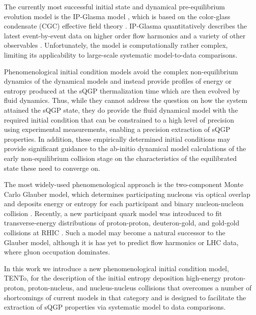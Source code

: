 \documentclass[aps,prc,reprint,amsmath,nofootinbib]{revtex4-1}
\newcommand{\trento}{T\raisebox{-.5ex}{R}ENTo}
\begin{document}
The currently most successful initial state and dynamical pre-equilibrium evolution model is the IP-Glasma model \cite{Schenke:2012wb}, which is based on the color-glass condensate (CGC) effective field theory \cite{McLerran:1993ni,McLerran:1993ka,Gelis:2010nm}.
IP-Glasma quantitatively describes the latest event-by-event data on higher order flow harmonics and a variety of other observables \cite{Schenke:2014zha}.
Unfortunately, the model is computationally rather complex, limiting its applicability to large-scale systematic model-to-data comparisons.

Phenomenological initial condition models avoid the complex non-equilibrium dynamics of the dynamical models and instead provide profiles of energy or entropy produced at the sQGP thermalization time which are then evolved by fluid dynamics. Thus, while they cannot address the question on how the system attained the sQGP state, they do provide the fluid dynamical model with the required initial condition that can be constrained to a high level of precision using experimental measurements, enabling a precision extraction of sQGP properties. In addition, these empirically determined initial conditions may provide significant guidance to the ab-initio dynamical model calculations of the early non-equilibrium collision stage on the characteristics of the equilibrated state these need to converge on.

The most widely-used phenomenological approach is the two-component Monte Carlo Glauber model, which determines participating nucleons via optical overlap and deposits energy or entropy for each participant and binary nucleon-nucleon collision \cite{Miller:2007ri}.
Recently, a new participant quark model was introduced to fit  transverse-energy distributions of proton-proton, deuteron-gold, and gold-gold collisions at RHIC \cite{Adler:2013aqf}.
Such a model may become a natural successor to the Glauber model, although it is has yet to predict flow harmonics or LHC data, where gluon occupation dominates.

In this work we introduce a new phenomenological initial condition model, \trento, for the description of the initial entropy deposition high-energy proton-proton, proton-nucleus, and nucleus-nucleus collisions that overcomes a number of shortcomings of current models in that category and is designed to facilitate the extraction of sQGP properties via systematic model to data comparisons.


\end{document}
